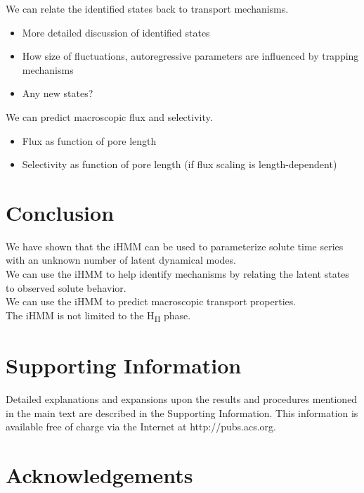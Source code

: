 \documentclass{article}
\begin{document}
  \noindent We can relate the identified states back to transport mechanisms.
  \begin{itemize}
  	\item More detailed discussion of identified states
  	\item How size of fluctuations, autoregressive parameters are influenced by trapping mechanisms
  	\item Any new states?
  \end{itemize}
  
  \noindent We can predict macroscopic flux and selectivity.
  \begin{itemize}
  	\item Flux as function of pore length
  	\item Selectivity as function of pore length (if flux scaling is length-dependent)
  \end{itemize}
 
  \section{Conclusion}
  
  \noindent We have shown that the iHMM can be used to parameterize solute time series
  with an unknown number of latent dynamical modes. \\
  
  \noindent We can use the iHMM to help identify mechanisms by relating the latent
  states to observed solute behavior. \\
  
  \noindent We can use the iHMM to predict macroscopic transport properties. \\
  
  \noindent The iHMM is not limited to the H\textsubscript{II} phase.
  
  \section*{Supporting Information}

  Detailed explanations and expansions upon the results and procedures mentioned in
  the main text are described in the Supporting Information. This information is
  available free of charge via the Internet at http://pubs.acs.org.

  \section*{Acknowledgements}
\end{document}
